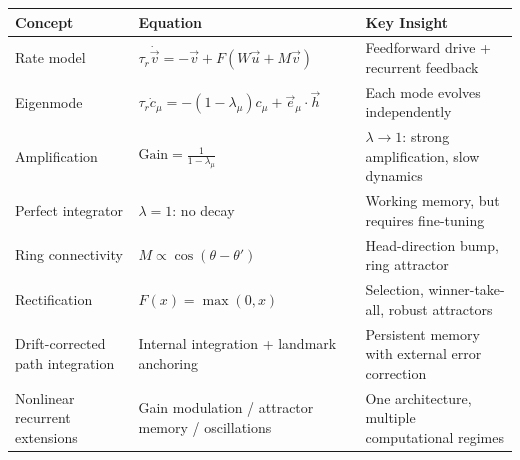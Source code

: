 \begin{chaptersummary}

\begin{center}
\renewcommand{\arraystretch}{1.6}
\begin{tabularx}{\textwidth}{@{}l X X@{}}
  \toprule
  \textbf{Concept} & \textbf{Equation} & \textbf{Key Insight} \\
  \midrule
  Rate model &
  $\tau_r\dot{\vec{v}} = -\vec{v} + F(W\vec{u} + M\vec{v})$ &
  Feedforward drive + recurrent feedback \\
  Eigenmode &
  $\tau_r\dot{c}_\mu = -(1 - \lambda_\mu)c_\mu + \vec{e}_\mu \cdot \vec{h}$ &
  Each mode evolves independently \\
  Amplification &
  $\displaystyle\text{Gain} = \frac{1}{1 - \lambda_\mu}$ &
  $\lambda \to 1$: strong amplification, slow dynamics \\
  Perfect integrator &
  $\lambda = 1$: no decay &
  Working memory, but requires fine-tuning \\
  Ring connectivity &
  $M \propto \cos(\theta - \theta')$ &
  Head-direction bump, ring attractor \\
  Rectification &
  $F(x) = \max(0, x)$ &
  Selection, winner-take-all, robust attractors \\
  Drift-corrected path integration &
  Internal integration + landmark anchoring &
  Persistent memory with external error correction \\
  Nonlinear recurrent extensions &
  Gain modulation / attractor memory / oscillations &
  One architecture, multiple computational regimes \\
  \bottomrule
\end{tabularx}
\end{center}

\end{chaptersummary}

